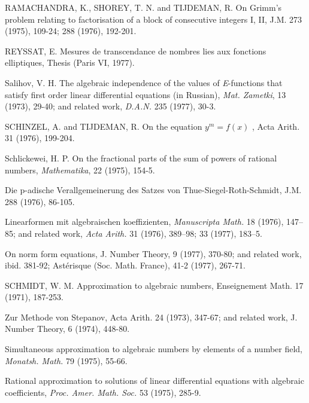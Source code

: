 \begin{hanglist}
    \item RAMACHANDRA, K., SHOREY, T. N. and TIJDEMAN, R. On Grimm's problem relating to factorisation of a block of consecutive integers I, II, J.M. 273 (1975), 109-24; 288 (1976), 192-201.
    \item REYSSAT, E. Mesures de transcendance de nombres lies aux fonctions elliptiques, Thesis (Paris VI, 1977).
    \item Salihov, V. H. The algebraic independence of the values of \textit{E}-functions that satisfy first order linear differential equations (in Russian), \textit{Mat. Zametki}, 13 (1973), 29-40; and related work, \textit{D.A.N.} 235 (1977), 30-3.
    \item SCHINZEL, A. and TIJDEMAN, R. On the equation  $y^m = f(x)$ , Acta Arith. 31 (1976), 199-204.
    \item Schlickewei, H. P. On the fractional parts of the sum of powers of rational numbers, \textit{Mathematika}, 22 (1975), 154-5.
    \item \hspace{1.5em} Die p-adische Verallgemeinerung des Satzes von Thue-Siegel-Roth-Schmidt, J.M. 288 (1976), 86-105.
    \item \hspace{1.5em} Linearformen mit algebraischen koeffizienten, \textit{Manuscripta Math.} 18 (1976), 147–85; and related work, \textit{Acta Arith.} 31 (1976), 389–98; 33 (1977), 183–5.
    \item \hspace{1.5em} On norm form equations, J. Number Theory, 9 (1977), 370-80; and related work, ibid. 381-92; Astérisque (Soc. Math. France), 41-2 (1977), 267-71.
    \item SCHMIDT, W. M. Approximation to algebraic numbers, Enseignement Math. 17 (1971), 187-253.
    \item \hspace{1.5em} Zur Methode von Stepanov, Acta Arith. 24 (1973), 347-67; and related work, J. Number Theory, 6 (1974), 448-80.
    \item \hspace{1.5em} Simultaneous approximation to algebraic numbers by elements of a number field, \textit{Monatsh. Math.} 79 (1975), 55-66.
    \item \hspace{1.5em} Rational approximation to solutions of linear differential equations with algebraic coefficients, \textit{Proc. Amer. Math. Soc.} 53 (1975), 285-9.

\end{hanglist}
